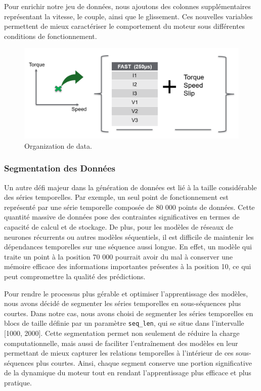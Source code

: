 Pour enrichir notre jeu de données, nous ajoutons des colonnes supplémentaires
représentant la vitesse, le couple, ainsi que le glissement. Ces nouvelles
variables permettent de mieux caractériser le comportement du moteur sous
différentes conditions de fonctionnement.

\begin{figure}[hbt!]
  \centering
  \includegraphics[width=12cm]{images_pfe/couple_vittese_glissement.png}
  \caption{Organization de data.}
  \label{fig:data_v_i}
\end{figure}
\FloatBarrier

\subsubsection{Segmentation des Données}
Un autre défi majeur dans la génération de données est lié à la taille
considérable des séries temporelles. Par exemple, un seul point de
fonctionnement est représenté par une série temporelle composée de 80 000
points de données. Cette quantité massive de données pose des contraintes
significatives en termes de capacité de calcul et de stockage. De plus, pour
les modèles de réseaux de neurones récurrents ou autres modèles séquentiels, il
est difficile de maintenir les dépendances temporelles sur une séquence aussi
longue. En effet, un modèle qui traite un point à la position 70 000 pourrait
avoir du mal à conserver une mémoire efficace des informations importantes
présentes à la position 10, ce qui peut compromettre la qualité des
prédictions.

Pour rendre le processus plus gérable et optimiser l'apprentissage des modèles,
nous avons décidé de segmenter les séries temporelles en sous-séquences plus
courtes. Dans notre cas, nous avons choisi de segmenter les séries temporelles
en blocs de taille définie par un paramètre \texttt{seq\_len}, qui se situe
dans l'intervalle [1000, 2000]. Cette segmentation permet non seulement de
réduire la charge computationnelle, mais aussi de faciliter l'entraînement des
modèles en leur permettant de mieux capturer les relations temporelles à
l'intérieur de ces sous-séquences plus courtes. Ainsi, chaque segment conserve
une portion significative de la dynamique du moteur tout en rendant
l'apprentissage plus efficace et plus pratique.

